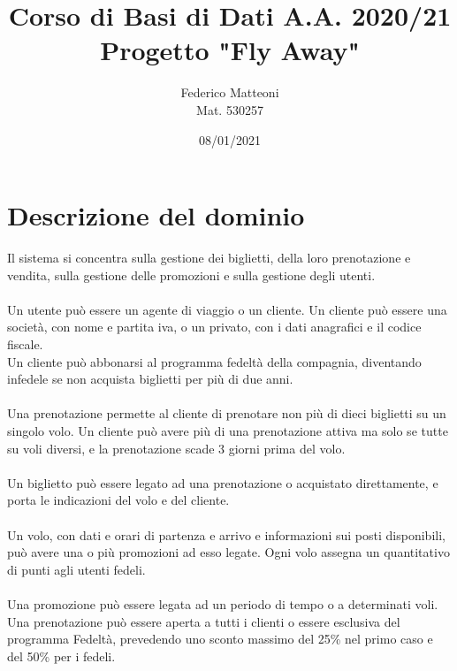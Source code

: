 \documentclass[10pt]{article}
\begin{document}
\renewcommand*\contentsname{Indice}
\title{Corso di Basi di Dati A.A. 2020/21\\Progetto "Fly Away"}
\author{Federico Matteoni\\Mat. 530257}
\date{08/01/2021}
\maketitle
\pagebreak
\section{Descrizione del dominio}
Il sistema si concentra sulla gestione dei biglietti, della loro prenotazione e vendita, sulla gestione delle promozioni e sulla gestione degli utenti.\\\\
Un utente può essere un agente di viaggio o un cliente. Un cliente può essere una società, con nome e partita iva, o un privato, con i dati anagrafici e il codice fiscale.\\
Un cliente può abbonarsi al programma fedeltà della compagnia, diventando infedele se non acquista biglietti per più di due anni.\\\\
Una prenotazione permette al cliente di prenotare non più di dieci biglietti su un singolo volo. Un cliente può avere più di una prenotazione attiva ma solo se tutte su voli diversi, e la prenotazione scade 3 giorni prima del volo.\\\\Un biglietto può essere legato ad una prenotazione o acquistato direttamente, e porta le indicazioni del volo e del cliente.\\\\
Un volo, con dati e orari di partenza e arrivo e informazioni sui posti disponibili, può avere una o più promozioni ad esso legate. Ogni volo assegna un quantitativo di punti agli utenti fedeli.\\\\Una promozione può essere legata ad un periodo di tempo o a determinati voli. Una prenotazione può essere aperta a tutti i clienti o essere esclusiva del programma Fedeltà, prevedendo uno sconto massimo del 25\% nel primo caso e del 50\% per i fedeli.
\end{document}
